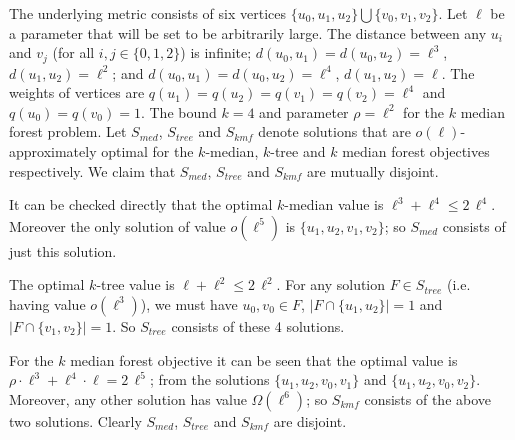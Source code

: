\documentclass[11pt,twoside,a4paper]{article}
\def\kmf{$k$ median forest\xspace}
\begin{document}
The underlying metric consists of six vertices $\{u_0,u_1,u_2\}\bigcup \{v_0,v_1,v_2\}$. Let $\ell$ be a parameter that
will be set to be arbitrarily large. The distance between any $u_i$ and $v_j$ (for all $i,j\in\{0,1,2\}$) is infinite;
$d(u_0,u_1)=d(u_0,u_2)=\ell^3$, $d(u_1,u_2)=\ell^2$; and $d(u_0,u_1)=d(u_0,u_2)=\ell^4$, $d(u_1,u_2)=\ell$. The weights
of vertices are $q(u_1)=q(u_2)=q(v_1)=q(v_2)=\ell^4$ and $q(u_0)=q(v_0)=1$. The bound $k=4$ and parameter $\rho=\ell^2$
for the \kmf problem. Let $S_{med}$, $S_{tree}$ and $S_{kmf}$ denote solutions that are $o(\ell)$-approximately optimal
for the $k$-median, $k$-tree and \kmf objectives respectively. We claim that $S_{med}$, $S_{tree}$ and $S_{kmf}$ are
mutually disjoint.

It can be checked directly that the optimal $k$-median value is $\ell^3+\ell^4\le 2\,\ell^4$. Moreover the only
solution of value $o(\ell^5)$ is $\{u_1,u_2,v_1,v_2\}$; so $S_{med}$ consists of just this solution.

The optimal $k$-tree value is $\ell+\ell^2\le 2\,\ell^2$. For any solution $F\in S_{tree}$ (i.e. having value
$o(\ell^3)$), we must have $u_0,v_0\in F$, $|F\cap \{u_1,u_2\}|=1$ and $|F\cap \{v_1,v_2\}|=1$. So $S_{tree}$ consists
of these 4 solutions.

For the \kmf objective it can be seen that the optimal value is $\rho\cdot \ell^3 + \ell^4\cdot \ell=2\,\ell^5$; from
the solutions $\{u_1,u_2,v_0,v_1\}$ and $\{u_1,u_2,v_0,v_2\}$. Moreover, any other solution has value $\Omega(\ell^6)$;
so $S_{kmf}$ consists of the above two solutions. Clearly $S_{med}$, $S_{tree}$ and $S_{kmf}$ are disjoint.
\end{document}
